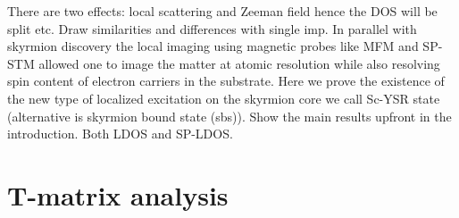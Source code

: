 \documentclass[twocolumn,showpacs,floatfix,nofootinbib,longbibliography]{revtex4-1}
\begin{document}
There are two effects: local scattering and Zeeman field hence the DOS will be split etc.  Draw similarities and differences with single imp.
In parallel with skyrmion discovery the local imaging using magnetic probes like MFM and SP-STM allowed one to image the matter at atomic resolution while also resolving spin content of electron carriers in the substrate.  
Here we prove the existence of the new type of localized excitation on the skyrmion core we call  Sc-YSR state (alternative is skyrmion bound state (sbs)).  Show the main results upfront in the introduction. Both LDOS and SP-LDOS. 




%



\appendix 

\section{T-matrix analysis} \label{sec:appendixTMatrix}
\end{document}
